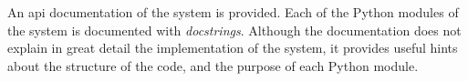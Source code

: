 
An \gls{api} documentation of the system is
provided.
Each of the Python modules of the system is documented with
\emph{docstrings}.
Although the documentation does not explain in great detail
the implementation of the system, it provides useful hints
about the structure of the code, and the purpose of each
Python module.
